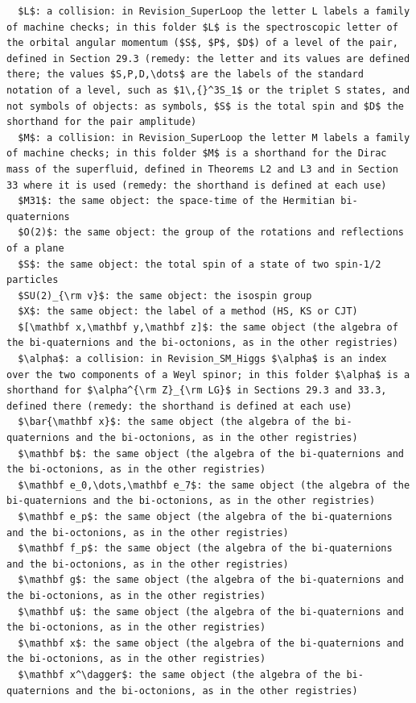\documentclass[
  10pt,
]{article}
\begin{document}
\begin{verbatim}
  $L$: a collision: in Revision_SuperLoop the letter L labels a family of machine checks; in this folder $L$ is the spectroscopic letter of the orbital angular momentum ($S$, $P$, $D$) of a level of the pair, defined in Section 29.3 (remedy: the letter and its values are defined there; the values $S,P,D,\dots$ are the labels of the standard notation of a level, such as $1\,{}^3S_1$ or the triplet S states, and not symbols of objects: as symbols, $S$ is the total spin and $D$ the shorthand for the pair amplitude)
  $M$: a collision: in Revision_SuperLoop the letter M labels a family of machine checks; in this folder $M$ is a shorthand for the Dirac mass of the superfluid, defined in Theorems L2 and L3 and in Section 33 where it is used (remedy: the shorthand is defined at each use)
  $M31$: the same object: the space-time of the Hermitian bi-quaternions
  $O(2)$: the same object: the group of the rotations and reflections of a plane
  $S$: the same object: the total spin of a state of two spin-1/2 particles
  $SU(2)_{\rm v}$: the same object: the isospin group
  $X$: the same object: the label of a method (HS, KS or CJT)
  $[\mathbf x,\mathbf y,\mathbf z]$: the same object (the algebra of the bi-quaternions and the bi-octonions, as in the other registries)
  $\alpha$: a collision: in Revision_SM_Higgs $\alpha$ is an index over the two components of a Weyl spinor; in this folder $\alpha$ is a shorthand for $\alpha^{\rm Z}_{\rm LG}$ in Sections 29.3 and 33.3, defined there (remedy: the shorthand is defined at each use)
  $\bar{\mathbf x}$: the same object (the algebra of the bi-quaternions and the bi-octonions, as in the other registries)
  $\mathbf b$: the same object (the algebra of the bi-quaternions and the bi-octonions, as in the other registries)
  $\mathbf e_0,\dots,\mathbf e_7$: the same object (the algebra of the bi-quaternions and the bi-octonions, as in the other registries)
  $\mathbf e_p$: the same object (the algebra of the bi-quaternions and the bi-octonions, as in the other registries)
  $\mathbf f_p$: the same object (the algebra of the bi-quaternions and the bi-octonions, as in the other registries)
  $\mathbf g$: the same object (the algebra of the bi-quaternions and the bi-octonions, as in the other registries)
  $\mathbf u$: the same object (the algebra of the bi-quaternions and the bi-octonions, as in the other registries)
  $\mathbf x$: the same object (the algebra of the bi-quaternions and the bi-octonions, as in the other registries)
  $\mathbf x^\dagger$: the same object (the algebra of the bi-quaternions and the bi-octonions, as in the other registries)

\end{verbatim}
\end{document}
